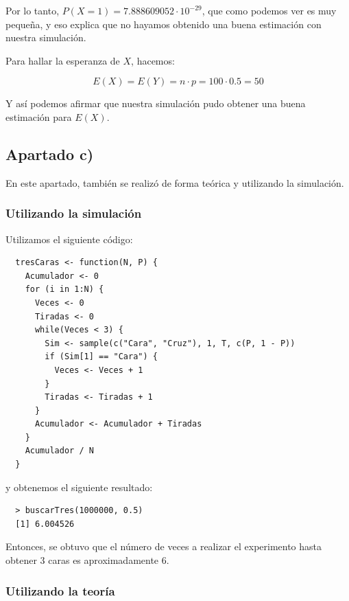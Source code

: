 \documentclass[11pt]{article}
\begin{document}
Por lo tanto, $ P(X = 1) =  7.888609052 \cdot 10^{-29}$, que como podemos ver
es muy pequeña, y eso explica que no hayamos obtenido una buena estimación con
nuestra simulación.

Para hallar la esperanza de $ X $, hacemos:

\begin{equation*}
    E(X) = E(Y) = n \cdot p = 100 \cdot 0.5 = 50
\end{equation*}

Y así podemos afirmar que nuestra simulación pudo obtener una buena estimación
para $ E(X) $.


\subsection*{Apartado c)}

En este apartado, también se realizó de forma teórica y utilizando la simulación.

\subsubsection*{Utilizando la simulación}

Utilizamos el siguiente código:

\begin{verbatim}
  tresCaras <- function(N, P) {
    Acumulador <- 0
    for (i in 1:N) {
      Veces <- 0
      Tiradas <- 0
      while(Veces < 3) {
        Sim <- sample(c("Cara", "Cruz"), 1, T, c(P, 1 - P))
        if (Sim[1] == "Cara") {
          Veces <- Veces + 1
        }
        Tiradas <- Tiradas + 1
      }
      Acumulador <- Acumulador + Tiradas
    }
    Acumulador / N
  }
\end{verbatim}

y obtenemos el siguiente resultado:

\begin{verbatim}
  > buscarTres(1000000, 0.5)
  [1] 6.004526
\end{verbatim}

Entonces, se obtuvo que el número de veces a realizar el experimento hasta
obtener 3 caras es aproximadamente 6.

\subsubsection*{Utilizando la teoría}
\end{document}

